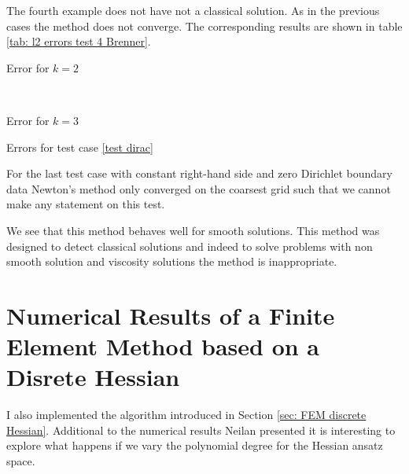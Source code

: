 The fourth example does not have not a classical solution. As in the previous cases the method does not converge. The corresponding results are shown in table \ref{tab: l2 errors test 4 Brenner}.

\begin{table}[h]
	\begin{subtable}[b]{0.45\textwidth}
		\centering
    	\caption{Error for $k=2$}
   \end{subtable}
   ~
	\begin{subtable}[b]{0.45\textwidth}
		\centering
 	\caption{Error for $k=3$}
	\end{subtable}
	\caption{Errors for test case \ref{test dirac}}
	\label{tab: l2 errors test 4 Brenner}
\end{table}

For the last test case with constant right-hand side and zero Dirichlet boundary data Newton's method only converged on the coarsest grid such that we cannot make any statement on this test.

We see that this method behaves well for smooth solutions. This method was designed to detect classical solutions and indeed to solve problems with non smooth solution and viscosity solutions the method is inappropriate.

\newpage
\section{Numerical Results of a Finite Element Method based on a Disrete Hessian}

I also implemented the algorithm introduced in Section \ref{sec: FEM discrete Hessian}.
Additional to the numerical results Neilan presented it is interesting to explore what happens if we vary the polynomial degree for the Hessian ansatz space. 

